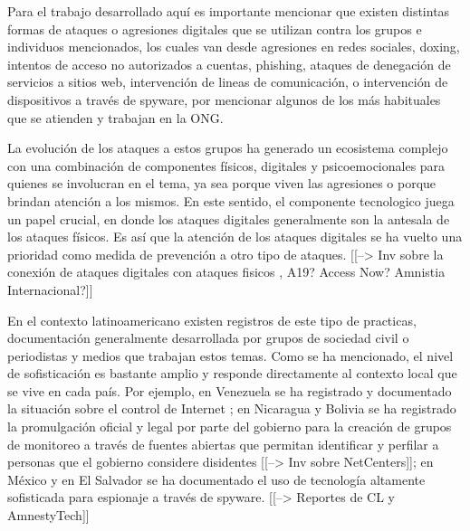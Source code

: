 \documentclass[12pt]{caltech_thesis}
\begin{document}
Para el trabajo desarrollado aquí es importante mencionar que existen distintas formas de ataques o agresiones digitales que se utilizan contra los grupos e individuos mencionados, los cuales van desde agresiones en redes sociales, doxing, intentos de acceso no autorizados a cuentas, phishing, ataques de denegación de servicios  a sitios web, intervención de lineas de comunicación, o intervención de dispositivos a través de spyware, por mencionar algunos de los más habituales que se atienden y trabajan en la ONG.

La evolución de los ataques a estos grupos ha generado un ecosistema complejo con una combinación de componentes físicos, digitales y psicoemocionales para quienes se involucran en el tema, ya sea porque viven las agresiones o porque brindan atención a los mismos. En este sentido, el componente tecnologico juega un papel crucial, en donde los ataques digitales generalmente son la antesala de los ataques físicos. Es así que la atención de los ataques digitales se ha vuelto una prioridad como medida de prevención a otro tipo de ataques. [[--> Inv sobre la conexión de ataques digitales con ataques fisicos , A19? Access Now? Amnistia Internacional?]]

En el contexto latinoamericano existen registros de este tipo de practicas, documentación generalmente desarrollada por grupos de sociedad civil o periodistas y medios que trabajan estos temas. Como se ha mencionado, el nivel de sofisticación es bastante amplio y responde directamente al contexto local que se vive en cada país. Por ejemplo, en Venezuela se ha registrado y documentado la situación sobre el control de Internet \citep{VeSinFiltro-Reporte-2023}; en Nicaragua y Bolivia se ha registrado la promulgación oficial y legal por parte del gobierno para la creación de grupos de monitoreo a través de fuentes abiertas que permitan identificar y perfilar a personas que el gobierno considere disidentes [[--> Inv sobre NetCenters]]; en México y en El Salvador se ha documentado el uso de tecnología altamente sofisticada para espionaje a través de spyware. [[--> Reportes de CL y AmnestyTech]]
\end{document}
